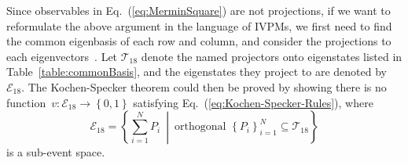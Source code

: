 \documentclass[english,reprint, aps, prl,superscriptaddress, showpacs,
showkeys, longbibliography, amsmath, amssymb]{revtex4-1}
\theoremstyle{plain}
\theoremstyle{definition}
\newcommand{\events}{\ensuremath{\mathcal{E}}}
\newcommand{\set}[2]{\ensuremath{\left\{ {#1}~\middle|~{#2}\right\} }}
\begin{document}
Since observables in Eq.~(\ref{eq:MerminSquare}) are not projections,
if we want to reformulate the above argument in the language of IVPMs,
we first need to find the common eigenbasis of each row and column,
and consider the projections to each eigenvectors~\cite{peres1995quantum,CabelloEstebaranzGarcia-Alcaine1996,Cabello_2008}.
Let $\mathcal{T}_{18}$ denote the named projectors onto eigenstates
listed in Table~\ref{table:commonBasis}, and the eigenstates they
project to are denoted by $\events_{18}$. The Kochen-Specker theorem
could then be proved by showing there is no function~$v:\events_{18}\rightarrow\left\{ 0,1\right\} $
satisfying Eq.~(\ref{eq:Kochen-Specker-Rules}), where
\begin{equation}
\events_{18}=\set{\sum_{i=1}^{N}P_{i}}{\textrm{orthogonal }\left\{ P_{i}\right\} _{i=1}^{N}\subseteq\mathcal{T}_{18}}
\end{equation}
is a sub-event space.
\end{document}

